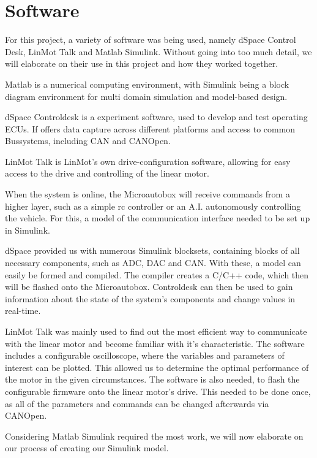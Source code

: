 
\chapter{Software}
\label{chp:Software}

For this project, a variety of software was being used, namely dSpace Control Desk, LinMot Talk and Matlab Simulink. Without going into too much detail, we will elaborate on their use in this project and how they worked together.


Matlab is a numerical computing environment, with Simulink being a block diagram environment for multi domain simulation and model-based design.

dSpace Controldesk is a experiment software, used to develop and test operating ECUs. If offers data capture across different platforms and access to common Bussystems, including CAN and CANOpen.

LinMot Talk is LinMot's own drive-configuration software, allowing for easy access to the drive and controlling of the linear motor.

When the system is online, the Microautobox will receive commands from a higher layer, such as a simple rc controller or an A.I. autonomously controlling the vehicle. For this, a model of the communication interface needed to be set up in Simulink.

dSpace provided us with numerous Simulink blocksets, containing blocks of all necessary components, such as ADC, DAC and CAN. With these, a model can easily be formed and compiled. The compiler creates a C/C++ code, which then will be flashed onto the Microautobox. Controldesk can then be used to gain information about the state of the system's components and change values in real-time.

LinMot Talk was mainly used to find out the most efficient way to communicate with the linear motor and become familiar with it's characteristic. The software includes a configurable oscilloscope, where the variables and parameters of interest can be plotted. This allowed us to determine the optimal performance of the motor in the given circumstances.
The software is also needed, to flash the configurable firmware onto the linear motor's drive. This needed to be done once, as all of the parameters and commands can be changed afterwards via CANOpen.


Considering Matlab Simulink required the most work, we will now elaborate on our process of creating our Simulink model.
